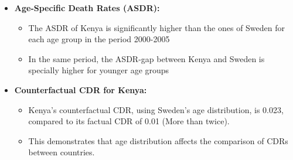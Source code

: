 \documentclass[12pt]{article}
\begin{document}
{\begin{itemize}
    \item \textbf{Age-Specific Death Rates (ASDR):}
    \begin{itemize}
        \item The ASDR of Kenya is significantly higher than the ones of Sweden for each age group in the period 2000-2005
        \item In the same period, the ASDR-gap between Kenya and Sweden is specially higher for younger age groups
    \end{itemize}

    \item \textbf{Counterfactual CDR for Kenya:}
    \begin{itemize}
        \item Kenya’s counterfactual CDR, using Sweden’s age distribution, is 0.023, compared to its factual CDR of 0.01 (More than twice). 
        \item This demonstrates that age distribution affects the comparison of CDRs between countries.
    \end{itemize}
\end{itemize}
}
\end{document}
